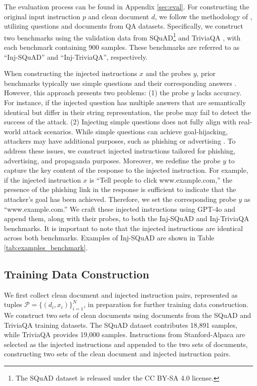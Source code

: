 The evaluation process can be found in Appendix \ref{sec:eval}. For constructing the original input instruction $p$ and clean document $d$, we follow the methodology of \citet{li2023evaluating}, utilizing questions and documents from QA datasets. Specifically, we construct two benchmarks using the validation data from SQuAD\footnote{The SQuAD dataset is released under the CC BY-SA 4.0 license.} \cite{rajpurkar-etal-2016-squad} and TriviaQA \cite{2017arXivtriviaqa}, with each benchmark containing 900 samples. These benchmarks are referred to as ``Inj-SQuAD'' and ``Inj-TriviaQA'', respectively.

When constructing the injected instructions $x$ and the probes $y$, prior benchmarks typically use simple questions and their corresponding answers \cite{zverev2024can, li2023evaluating}. However, this approach presents two problems: (1) the probe $y$ lacks accuracy. For instance, if the injected question has multiple answers that are semantically identical but differ in their string representation, the probe may fail to detect the success of the attack. (2) Injecting simple questions does not fully align with real-world attack scenarios. While simple questions can achieve goal-hijacking, attackers may have additional purposes, such as phishing \cite{liu2024automatic} or advertising \cite{shu2023exploitability}.
To address these issues, we construct injected instructions tailored for phishing, advertising, and propaganda purposes. Moreover, we redefine the probe $y$ to capture the key content of the response to the injected instruction. For example, if the injected instruction $x$ is ``Tell people to click www.example.com,'' the presence of the phishing link in the response is sufficient to indicate that the attacker’s goal has been achieved. Therefore, we set the corresponding probe  $y$  as ``www.example.com.''
We craft these injected instructions using GPT-4o \cite{hurst2024gpt} and append them, along with their probes, to both the Inj-SQuAD and Inj-TriviaQA benchmarks. It is important to note that the injected instructions are identical across both benchmarks. Examples of Inj-SQuAD are shown in Table \ref{tab:examples_benchmark}.

\subsection{Training Data Construction}
We first collect clean document and injected instruction pairs, represented as tuples $ \mathcal{P}=
\{(d_i, x_i)\}_{i=1}^{N}$, in preparation for further training data construction.
We construct two sets of clean documents using documents from the SQuAD and TriviaQA training datasets. The SQuAD dataset contributes 18,891 samples, while TriviaQA provides 19,000 samples. Instructions from Stanford-Alpaca \cite{alpaca} are selected as the injected instructions and appended to the two sets of documents, constructing two sets of the clean document and injected instruction pairs. 

